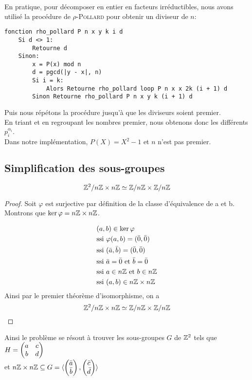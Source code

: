 \documentclass[11pt]{article}
\begin{document}
En pratique, pour décomposer en entier en facteurs irréductibles, nous avons utilisé la procédure de
\textsc{$\rho$-Pollard} pour obtenir un diviseur de $n$:
\begin{lstlisting}
fonction rho_pollard P n x y k i d
    Si d <> 1:
        Retourne d
    Sinon:
        x = P(x) mod n
        d = pgcd(|y - x|, n)
        Si i = k:
            Alors Retourne rho_pollard loop P n x x 2k (i + 1) d
        Sinon Retourne rho_pollard P n x y k (i + 1) d
\end{lstlisting}
Puis nous répétons la procédure jusqu'à que les diviseurs soient premier.\\
En triant et en regroupant les nombres premier, nous obtenons donc les différents $p^{\alpha_i}_i$.\\
Dans notre implémentation, $P(X) = X^2 - 1$ et $n$ n'est pas premier.

\newpage
\subsection{Simplification des sous-groupes}

\begin{proposition}
	$$\mathbb Z^2/n\mathbb Z \times n\mathbb Z \simeq \mathbb Z/n\mathbb Z \times \mathbb Z/n\mathbb Z $$
\end{proposition}
\begin{proof}
	Soit 
	$\varphi$ est surjective par définition de la classe d'équivalence de a et b.
	Montrons que $\ker \varphi = n\mathbb Z \times n\mathbb Z$.

	\begin{equation*}
		\begin{split}
			&(a,b) \in \ker \varphi \\
			&\text{ssi } \varphi(a,b) = (\bar 0, \bar 0)\\
			&\text{ssi } (\bar a, \bar b) = (\bar 0, \bar 0)\\
			&\text{ssi } \bar a = \bar 0 \text{ et } \bar b = \bar 0\\
			&\text{ssi } a \in n\mathbb Z \text{ et } b \in n\mathbb Z\\
			&\text{ssi } (a,b) \in  n\mathbb Z \times n\mathbb Z
		\end{split}
	\end{equation*}
	Ainsi par le premier théorème d'isomorphisme, on a
	$$\mathbb Z^2/n\mathbb Z \times n\mathbb Z \simeq \mathbb Z/n\mathbb Z \times \mathbb Z/n\mathbb Z $$
\end{proof}
Ainsi le problème se résout à trouver les sous-groupes $G$ de $\mathbb Z^2$ tels que
$H = \begin{pmatrix} a & c\\ b & d \end{pmatrix}$\\
et
$n\mathbb Z \times n\mathbb Z \subseteq G = \langle \begin{pmatrix} \bar a\\ \bar b \end{pmatrix}, \begin{pmatrix} \bar c\\ \bar d \end{pmatrix} \rangle$
\end{document}
